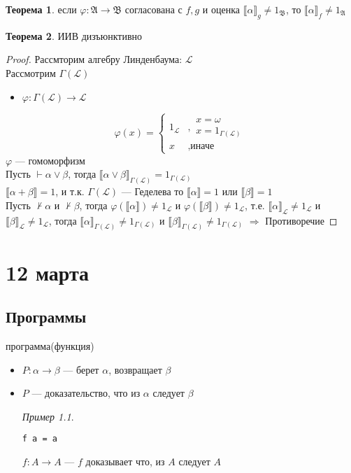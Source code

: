 \documentclass[oneside]{book}
\newcommand{\A}{\mathfrak{A}}
\newcommand{\B}{\mathfrak{B}}
\theoremstyle{plain}
\theoremstyle{remark}
\newtheorem*{examp}{Пример}
\theoremstyle{definition}
\newtheorem{theorem}{Теорема}[section]
\begin{document}
\begin{theorem}
если \(\varphi: \A \to \B\) согласована с \(f, g\) и оценка \(\llbracket \alpha \rrbracket_g \neq 1_\B\), то \(\llbracket \alpha \rrbracket_f \neq 1_\A\)
\end{theorem}
\begin{theorem}
ИИВ дизъюнктивно
\end{theorem}
\begin{proof}
Рассмторим алгебру Линденбаума: \(\mathcal{L}\) \\
Рассмотрим \(\Gamma(\mathcal{L})\) \\
\begin{itemize}
\item \(\varphi: \Gamma(\mathcal{L}) \to \mathcal{L}\)
\end{itemize}
\[ \varphi(x) = \begin{cases}1_\mathcal{L} & ,\substack{x =\omega \\ x = 1_{\Gamma(\mathcal{L})}} \\ x & , \text{иначе}\end{cases} \] 
\(\varphi\) --- гомоморфизм \\
Пусть \(\vdash \alpha \vee \beta\), тогда \(\llbracket \alpha \vee \beta \rrbracket_{\Gamma(\mathcal{L})} = 1_{\Gamma(\mathcal{L})}\) \\
\(\llbracket \alpha + \beta \rrbracket = 1\), и т.к. \(\Gamma(\mathcal{L})\) --- Геделева то \(\llbracket \alpha \rrbracket = 1\) или \(\llbracket \beta \rrbracket = 1\) \\
Пусть \(\not \vdash \alpha\) и \(\not \vdash \beta\), тогда \(\varphi(\llbracket \alpha \rrbracket) \neq 1_\mathcal{L}\) и \(\varphi(\llbracket \beta \rrbracket) \neq 1_\mathcal{L}\), т.е. \(\llbracket \alpha \rrbracket_\mathcal{L} \neq 1_\mathcal{L}\) и \(\llbracket \beta \rrbracket_\mathcal{L} \neq 1_\mathcal{L}\), тогда \(\llbracket \alpha \rrbracket_{\Gamma(\mathcal{L})} \neq 1_{\Gamma(\mathcal{L})}\) и \(\llbracket \beta \rrbracket_{\Gamma(\mathcal{L})} \neq 1_{\Gamma(\mathcal{L})}\) \(\Rightarrow\) Противоречие
\end{proof}
\chapter{12 марта}
\label{sec:org7fd4e2f}
\section{Программы}
\label{sec:orgea3da63}
программа(функция)
\begin{itemize}
\item \(P: \alpha \to \beta\) --- берет \(\alpha\), возвращает \(\beta\)
\item \(P\) --- доказательство, что из \(\alpha\) следует \(\beta\)
\begin{examp}
\-
\begin{verbatim}
f a = a
\end{verbatim}
\(f: A \to A\) --- \(f\) доказывает что, из \(A\) следует \(A\)
\end{examp}
\end{itemize}
\end{document}
